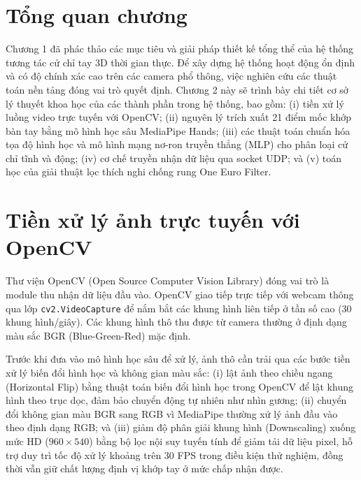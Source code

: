 \documentclass[../BTL.tex]{subfiles}
\begin{document}
\section*{Tổng quan chương}
Chương 1 đã phác thảo các mục tiêu và giải pháp thiết kế tổng thể của hệ thống tương tác cử chỉ tay 3D thời gian thực. Để xây dựng hệ thống hoạt động ổn định và có độ chính xác cao trên các camera phổ thông, việc nghiên cứu các thuật toán nền tảng đóng vai trò quyết định. Chương 2 này sẽ trình bày chi tiết cơ sở lý thuyết khoa học của các thành phần trong hệ thống, bao gồm: (i) tiền xử lý luồng video trực tuyến với OpenCV; (ii) nguyên lý trích xuất 21 điểm mốc khớp bàn tay bằng mô hình học sâu MediaPipe Hands; (iii) các thuật toán chuẩn hóa tọa độ hình học và mô hình mạng nơ-ron truyền thẳng (MLP) cho phân loại cử chỉ tĩnh và động; (iv) cơ chế truyền nhận dữ liệu qua socket UDP; và (v) toán học của giải thuật lọc thích nghi chống rung One Euro Filter.

\section{Tiền xử lý ảnh trực tuyến với OpenCV}
\label{section:2.1}
Thư viện OpenCV (Open Source Computer Vision Library) \cite{opencv_library} đóng vai trò là module thu nhận dữ liệu đầu vào. OpenCV giao tiếp trực tiếp với webcam thông qua lớp \texttt{cv2.VideoCapture} để nắm bắt các khung hình liên tiếp ở tần số cao (30 khung hình/giây). Các khung hình thô thu được từ camera thường ở định dạng màu sắc BGR (Blue-Green-Red) mặc định.

Trước khi đưa vào mô hình học sâu để xử lý, ảnh thô cần trải qua các bước tiền xử lý biến đổi hình học và không gian màu sắc: (i) lật ảnh theo chiều ngang (Horizontal Flip) bằng thuật toán biến đổi hình học trong OpenCV để lật khung hình theo trục dọc, đảm bảo chuyển động tự nhiên như nhìn gương; (ii) chuyển đổi không gian màu BGR sang RGB vì MediaPipe thường xử lý ảnh đầu vào theo định dạng RGB; và (iii) giảm độ phân giải khung hình (Downscaling) xuống mức HD ($960 \times 540$) bằng bộ lọc nội suy tuyến tính để giảm tải dữ liệu pixel, hỗ trợ duy trì tốc độ xử lý khoảng trên 30 FPS trong điều kiện thử nghiệm, đồng thời vẫn giữ chất lượng định vị khớp tay ở mức chấp nhận được.
\end{document}
